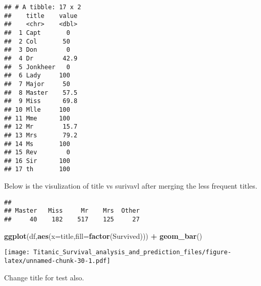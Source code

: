 \documentclass[]{article}
\newenvironment{Shaded}{\begin{snugshade}}{\end{snugshade}}
\newcommand{\KeywordTok}[1]{\textcolor[rgb]{0.13,0.29,0.53}{\textbf{#1}}}
\newcommand{\DataTypeTok}[1]{\textcolor[rgb]{0.13,0.29,0.53}{#1}}
\newcommand{\StringTok}[1]{\textcolor[rgb]{0.31,0.60,0.02}{#1}}
\newcommand{\OperatorTok}[1]{\textcolor[rgb]{0.81,0.36,0.00}{\textbf{#1}}}
\newcommand{\NormalTok}[1]{#1}
\begin{document}
\begin{verbatim}
## # A tibble: 17 x 2
##    title    value
##    <chr>    <dbl>
##  1 Capt       0  
##  2 Col       50  
##  3 Don        0  
##  4 Dr        42.9
##  5 Jonkheer   0  
##  6 Lady     100  
##  7 Major     50  
##  8 Master    57.5
##  9 Miss      69.8
## 10 Mlle     100  
## 11 Mme      100  
## 12 Mr        15.7
## 13 Mrs       79.2
## 14 Ms       100  
## 15 Rev        0  
## 16 Sir      100  
## 17 th       100
\end{verbatim}

Below is the visulization of title vs surivavl after merging the less
frequent titles.

\begin{Shaded}
\end{Shaded}

\begin{verbatim}
## 
## Master   Miss     Mr    Mrs  Other 
##     40    182    517    125     27
\end{verbatim}

\begin{Shaded}
\begin{Highlighting}[]
\KeywordTok{ggplot}\NormalTok{(df,}\KeywordTok{aes}\NormalTok{(}\DataTypeTok{x=}\NormalTok{title,}\DataTypeTok{fill=}\KeywordTok{factor}\NormalTok{(Survived))) }\OperatorTok{+}\StringTok{ }\KeywordTok{geom_bar}\NormalTok{()}
\end{Highlighting}
\end{Shaded}

\texttt{[image: Titanic\_Survival\_analysis\_and\_prediction\_files/figure-latex/unnamed-chunk-30-1.pdf]}

Change title for test also.

\begin{Shaded}
\end{Shaded}
\end{document}
